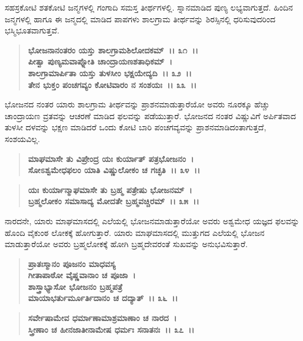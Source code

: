 ಸಹಸ್ರಕೋಟಿ ಶತಕೋಟಿ ಜನ್ಮಗಳಲ್ಲಿ ಗಂಗಾದಿ ಸಮಸ್ತ ತೀರ್ಥಗಳಲ್ಲಿ. ಸ್ನಾನಮಾಡಿದ ಪುಣ್ಯ ಲಭ್ಯವಾಗುತ್ತದೆ. ಹಿಂದಿನ ಜನ್ಮಗಳಲ್ಲಿ ಹಾಗೂ ಈ ಜನ್ಮದಲ್ಲಿ ಮಾಡಿದ ಪಾಪಗಳು ಶಾಲಗ್ರಾಮ ತೀರ್ಥವನ್ನು ಶಿರಸ್ಸಿನಲ್ಲಿ ಧರಿಸುವುದರಿಂದ ಭಸ್ಮಿಭೂತವಾಗುತ್ತವೆ.

\begin{verse}
\textbf{ಭೋಜನಾನಂತರಂ ಯಸ್ತು ಶಾಲಗ್ರಾಮಶಿಲೋದಕಮ್~।। ೩೧~।।}\\\textbf{ಪೀತ್ವಾ ಪುಣ್ಯಮವಾಪ್ನೋತಿ ಚಾಂದ್ರಾಯಣಶತಾಧಿಕಮ್~। }\\\textbf{ಶಾಲಗ್ರಾಮಾರ್ಪಿತಾ ಯಸ್ತು ತುಳಸೀಂ ಭಕ್ಷಯೇದ್ಯದಿ~।। ೩೨~।।} \\\textbf{ತೇನ ಭುಕ್ತಂ ಪಂಚಗವ್ಯಂ ಕೋಟಿವಾರಂ ನ ಸಂಶಯಃ~।। ೩೩~।।}
\end{verse}

ಭೋಜನದ ನಂತರ ಯಾರು ಶಾಲಗ್ರಾಮ ತೀರ್ಥವನ್ನು ಪ್ರಾಶನಮಾಡುತ್ತಾರೆಯೋ ಅವರು ನೂರಕ್ಕೂ ಹೆಚ್ಚು ಚಾಂದ್ರಾಯಣ ವ್ರತವನ್ನು ಆಚರಣೆ ಮಾಡಿದ ಫಲವನ್ನು ಪಡೆಯುತ್ತಾರೆ. ಭೋಜನದ ನಂತರ ವಿಷ್ಣುವಿಗೆ ಅರ್ಪಿತವಾದ ತುಳಸೀ ದಳವನ್ನು ಭಕ್ಷಣ ಮಾಡಿದರೆ ಒಂದು ಕೋಟಿ ಬಾರಿ ಪಂಚಗವ್ಯವನ್ನು ಪ್ರಾಶನಮಾಡಿದಂತಾಗುತ್ತದೆ, ಸಂಶಯವಿಲ್ಲ.

\begin{verse}
\textbf{ಮಾಘಮಾಸೇ ತು ವಿಪ್ರೇಂದ್ರ ಯಃ ಕುರ್ಯಾತ್ ಪತ್ರಭೋಜನಂ~।}\\\textbf{ಸೋಽಶ್ವಮೇಧಫಲಂ ಯಾತಿ ವಿಷ್ಣುಲೋಕಂ ಚ ಗಚ್ಛತಿ~।। ೩೪~।। }
\end{verse}

\begin{verse}
\textbf{ಯಃ ಕುರ್ಯಾನ್ಮಾಘಮಾಸೇ ತು ಬ್ರಹ್ಮ ಪತ್ರೇಷು ಭೋಜನಮ್~।}\\\textbf{ಬ್ರಹ್ಮಲೋಕಂ ಸಮಾಸಾದ್ಯ ಮೋದತೇ ಬ್ರಹ್ಮವಚ್ಚಿರಮ್~।। ೩೫~।।}
\end{verse}

ನಾರದನೇ, ಯಾರು ಮಾಘಮಾಸದಲ್ಲಿ ಎಲೆಯಲ್ಲಿ ಭೋಜನಮಾಡುತ್ತಾರೆಯೋ ಅವರು ಅಶ್ವಮೇಧ ಯಜ್ಞದ ಫಲವನ್ನು ಹೊಂದಿ ವೈಕುಂಠ ಲೋಕಕ್ಕೆ ಹೋಗುತ್ತಾರೆ. ಯಾರು ಮಾಘಮಾಸದಲ್ಲಿ ಮುತ್ತುಗದ ಎಲೆಯಲ್ಲಿ ಭೋಜನ ಮಾಡುತ್ತಾರೆಯೋ ಅವರು ಬ್ರಹ್ಮಲೋಕಕ್ಕೆ ಹೋಗಿ ಬ್ರಹ್ಮದೇವರಂತೆ ಸುಖವನ್ನು ಅನುಭವಿಸುತ್ತಾರೆ.

\begin{verse}
\textbf{ಪ್ರಾತಃಸ್ಮಾನಂ ಪೂಜನಂ ಮಾಧವಸ್ಯ}\\\textbf{ಗೀತಾಪಾಠೋ ವೈಷ್ಣವಾನಾಂ ಚ ಪೂಜಾ~। }\\\textbf{ಶಾಸ್ತ್ರಾಭ್ಯಾಸೋ ಭೋಜನಂ ಬ್ರಹ್ಮಪತ್ರೆ} \\\textbf{ಮಾಯಾಭರ್ತುರ್ಮೂರ್ತಿದಾನಂ ಚ ದದ್ಯಾತ್~।। ೩೬~।। }
\end{verse}

\begin{verse}
\textbf{ಸರ್ವೇಷಾಮೇವ ಧರ್ಮಾಣಾಮಾಶ್ರಮಾಣಾಂ ಚ ನಾರದ~।}\\\textbf{ಸ್ತ್ರೀಣಾಂ ಚ ಹೀನಜಾತೀನಾಮೇಷ ಧರ್ಮಃ ಸನಾತನಃ~।। ೩೭~।।}
\end{verse}

